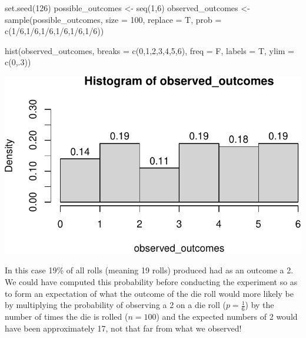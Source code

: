 \documentclass[
  letterpaper,
  DIV=11,
  numbers=noendperiod]{scrartcl}
\newenvironment{Shaded}{\begin{snugshade}}{\end{snugshade}}
\newcommand{\AttributeTok}[1]{\textcolor[rgb]{0.40,0.45,0.13}{#1}}
\newcommand{\DecValTok}[1]{\textcolor[rgb]{0.68,0.00,0.00}{#1}}
\newcommand{\FunctionTok}[1]{\textcolor[rgb]{0.28,0.35,0.67}{#1}}
\newcommand{\NormalTok}[1]{\textcolor[rgb]{0.00,0.23,0.31}{#1}}
\newcommand{\OtherTok}[1]{\textcolor[rgb]{0.00,0.23,0.31}{#1}}
\newcommand{\SpecialCharTok}[1]{\textcolor[rgb]{0.37,0.37,0.37}{#1}}
\begin{document}
\begin{Shaded}
\begin{Highlighting}[]
\FunctionTok{set.seed}\NormalTok{(}\DecValTok{126}\NormalTok{)}
\NormalTok{possible\_outcomes }\OtherTok{\textless{}{-}} \FunctionTok{seq}\NormalTok{(}\DecValTok{1}\NormalTok{,}\DecValTok{6}\NormalTok{)}
\NormalTok{observed\_outcomes }\OtherTok{\textless{}{-}} \FunctionTok{sample}\NormalTok{(possible\_outcomes, }\AttributeTok{size =} \DecValTok{100}\NormalTok{, }
                            \AttributeTok{replace =}\NormalTok{ T, }\AttributeTok{prob =} \FunctionTok{c}\NormalTok{(}\DecValTok{1}\SpecialCharTok{/}\DecValTok{6}\NormalTok{,}\DecValTok{1}\SpecialCharTok{/}\DecValTok{6}\NormalTok{,}\DecValTok{1}\SpecialCharTok{/}\DecValTok{6}\NormalTok{,}\DecValTok{1}\SpecialCharTok{/}\DecValTok{6}\NormalTok{,}\DecValTok{1}\SpecialCharTok{/}\DecValTok{6}\NormalTok{,}\DecValTok{1}\SpecialCharTok{/}\DecValTok{6}\NormalTok{))}

\FunctionTok{hist}\NormalTok{(observed\_outcomes, }\AttributeTok{breaks =} \FunctionTok{c}\NormalTok{(}\DecValTok{0}\NormalTok{,}\DecValTok{1}\NormalTok{,}\DecValTok{2}\NormalTok{,}\DecValTok{3}\NormalTok{,}\DecValTok{4}\NormalTok{,}\DecValTok{5}\NormalTok{,}\DecValTok{6}\NormalTok{), }\AttributeTok{freq =}\NormalTok{ F, }
     \AttributeTok{labels =}\NormalTok{ T, }\AttributeTok{ylim =} \FunctionTok{c}\NormalTok{(}\DecValTok{0}\NormalTok{,.}\DecValTok{3}\NormalTok{))}
\end{Highlighting}
\end{Shaded}

\includegraphics{stats_review_files/figure-pdf/unnamed-chunk-17-1.pdf}

In this case 19\% of all rolls (meaning 19 rolls) produced had as an
outcome a 2. We could have computed this probability before conducting
the experiment so as to form an expectation of what the outcome of the
die roll would more likely be by multiplying the probability of
observing a 2 on a die roll (\(p=\frac{1}{6}\)) by the number of times
the die is rolled (\(n=100\)) and the expected numbers of 2 would have
been approximately 17, not that far from what we observed!
\end{document}
